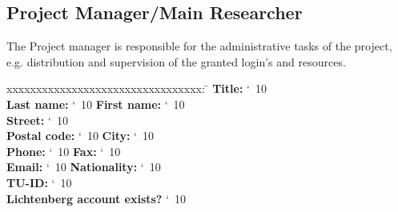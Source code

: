 \documentclass[accentcolor=tud9c,nochapname,11pt]{tudexercise}
\makeatletter
\newcommand\saferead[1]{%
  \bgroup
  \let\do\@makeother
  \dospecials\catcode`\ 10
  \egroup 
}
\makeatother
\begin{document}
\begin{Form}
\subsection{Project Manager/Main Researcher}
The Project manager is responsible for the administrative tasks of the project, e.g. distribution and supervision of the granted login's and resources.   \\
\begin{tabbing}
xxxxxxxxxxxxxxxxxxxxxxxxxxxxxxxxx:  \= \kill
\textbf{Title:}  \saferead{pm_title.txt} \\
\textbf{Last name:} \saferead{pm_lname.txt} \> \>  \textbf{First name:} \saferead{pm_fname.txt}  \\
\textbf{Street:} \saferead{pm_street.txt}  \\
\textbf{Postal code:} \saferead{pm_pcode.txt}   \> \> \textbf{City:} \saferead{pm_city.txt} \\
\textbf{Phone:} \saferead{pm_phone.txt}  \> \> \textbf{Fax:} \saferead{pm_fax.txt}   \\
\textbf{Email:} \saferead{pm_email.txt}  \> \>  \textbf{Nationality:} \saferead{pm_nat.txt}   \\
\textbf{TU-ID:}  \saferead{pm_tuid.txt} \\
\textbf{Lichtenberg account exists?} \saferead{pm_lichtacc.txt}
\end{tabbing}

\end{Form}
\end{document}
